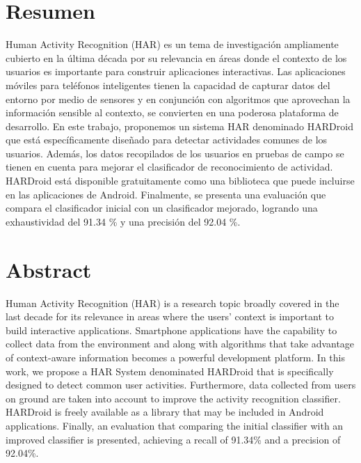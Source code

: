 
\chapter*{Resumen}
Human Activity Recognition (HAR) es un tema de investigación ampliamente cubierto en la última década por su relevancia en áreas donde el contexto de los usuarios es importante para construir aplicaciones interactivas. Las aplicaciones móviles para teléfonos inteligentes tienen la capacidad de capturar datos del entorno por medio de sensores y en conjunción con algoritmos que aprovechan la información sensible al contexto, se convierten en una poderosa plataforma de desarrollo. En este trabajo, proponemos un sistema HAR denominado HARDroid que está específicamente diseñado para detectar actividades comunes de los usuarios. Además, los datos recopilados de los usuarios en pruebas de campo se tienen en cuenta para mejorar el clasificador de reconocimiento de actividad. HARDroid está disponible gratuitamente como una biblioteca que puede incluirse en las aplicaciones de Android. Finalmente, se presenta una evaluación que compara el clasificador inicial con un clasificador mejorado, logrando una exhaustividad del 91.34 \% y una precisión del 92.04 \%.


\chapter*{Abstract}
Human Activity Recognition (HAR) is a research topic broadly covered in the last decade for its relevance in areas where the users’ context is important to build interactive applications. Smartphone applications have the capability to collect data from the environment and along with algorithms that take advantage of context-aware information becomes a powerful development platform. In this work, we propose a HAR System denominated HARDroid that is specifically designed to detect common user activities. Furthermore, data collected from users on ground are taken into account to improve the activity recognition classifier. HARDroid is freely available as a library that may be included in Android applications. Finally, an evaluation that comparing the initial classifier with an improved classifier is presented, achieving a recall of 91.34\% and a precision of 92.04\%.

